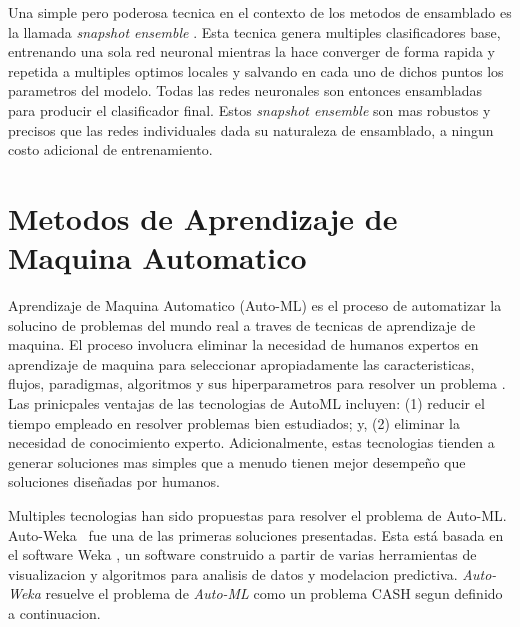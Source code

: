 Una simple pero poderosa tecnica en el contexto de los metodos de ensamblado es la llamada \textit{snapshot ensemble} \cite{huang17snapshot}. Esta tecnica genera multiples clasificadores base, entrenando una sola red neuronal mientras la hace converger de forma rapida y repetida a multiples optimos locales y salvando en cada uno de dichos puntos los parametros del modelo. Todas las redes neuronales son entonces ensambladas para producir el clasificador final. Estos \textit{snapshot ensemble} son mas robustos y precisos que las redes individuales dada su naturaleza de ensamblado, a ningun costo adicional de entrenamiento.

\section{Metodos de Aprendizaje de Maquina Automatico}\label{section:automl}

Aprendizaje de Maquina Automatico (Auto-ML) es el proceso de automatizar la solucino de problemas del mundo real a traves de tecnicas de aprendizaje de maquina. El proceso involucra eliminar la necesidad de humanos expertos en aprendizaje de maquina para seleccionar apropiadamente las caracteristicas, flujos, paradigmas, algoritmos y sus hiperparametros para resolver un problema \cite{Dimitrakakis_Liu_Parkes_Radanovic_2019}. Las prinicpales ventajas de las tecnologias de AutoML incluyen: (1) reducir el tiempo empleado en resolver problemas bien estudiados; y, (2) eliminar la necesidad de conocimiento experto. Adicionalmente, estas tecnologias tienden a generar soluciones mas simples que a menudo tienen mejor desempeño que soluciones diseñadas por humanos.

Multiples tecnologias han sido propuestas para resolver el problema de Auto-ML. Auto-Weka~\cite{autoweka} fue una de las primeras soluciones presentadas. Esta está basada en el software Weka \cite{weka}, un software construido a partir de varias herramientas de visualizacion y algoritmos para analisis de datos y modelacion predictiva. \textit{Auto-Weka} resuelve el problema de \textit{Auto-ML} como un problema CASH segun definido a continuacion.

